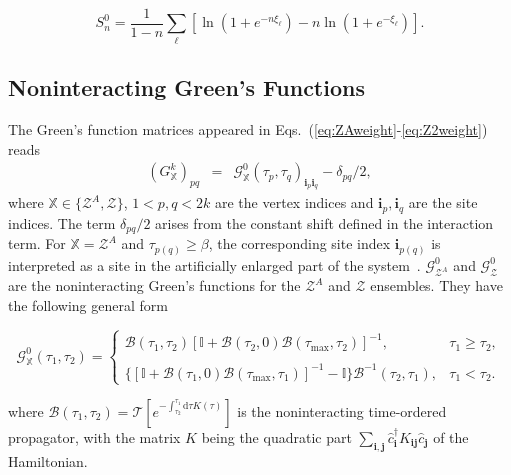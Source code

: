 \documentclass[twocolumn,english,prl,showpacs]{revtex4}
\begin{document}
\begin{equation*}
S_{n}^{0} = \frac{1}{1-n} \sum_{\ell} \left[ \ln (1+e^{-n\xi_{\ell}}) - n \ln(1+e^{-\xi_{\ell}}) \right]. 
\end{equation*}


\subsection{Noninteracting Green's Functions}
The Green's function matrices appeared in Eqs.~(\ref{eq:ZAweight}-\ref{eq:Z2weight}) reads
\begin{eqnarray}
\left(G^{k}_{\mathbb{X}} \right) _{pq} & =&\mathcal{G}^{0}_{\mathbb{X}}(\tau_{p}, \tau_{q}) _{\mathbf{i}_{p}\mathbf{i}_{q} } - \delta_{pq}/2,
\label{eq:G}
\end{eqnarray}
where $\mathbb{X}\in \{ \mathcal{Z}^{A}, \mathcal{Z}\}$,  $1<p,q<2k$ are the vertex indices and $\mathbf{i}_{p},\mathbf{i}_{q}$ are the site indices. The term $\delta_{pq}/2$ arises from the constant shift defined in the interaction term. For $\mathbb{X}=\mathcal{Z}^{A}$ and $\tau_{p(q)} \ge \beta$, the corresponding site index $\mathbf{i}_{p(q)}$ is interpreted  as a site in the artificially enlarged part of the system~\cite{Broecker:2014ud}. $\mathcal{G}^{0}_{\mathcal{Z}^{A}}$ and $\mathcal{G}^{0}_{\mathcal{Z}}$ are the noninteracting Green's functions for the $\mathcal{Z}^{A}$  and $\mathcal{Z}$ ensembles. They have the following general form
\cite{Assaad:2008hx}

\begin{widetext}
\begin{equation}
\mathcal{G}^{0}_{\mathbb{X}}(\tau_{1}, \tau_{2})   =\begin{cases}
 \mathcal{B}(\tau_{1}, \tau_{2}) [\mathbb{I} + \mathcal{B}(\tau_{2}, 0)\mathcal{B}(\tau_{\max}, \tau_{2}) ]^{-1} , & \text{$\tau_{1}\ge \tau_{2}$}, \\ \\
 \{ [\mathbb{I} +    \mathcal{B}(\tau_{1}, 0)\mathcal{B}(\tau_{\max}, \tau_{1})]^{-1} -\mathbb{I}\}   \mathcal{B}^{-1}(\tau_{2},\tau_{1})  
    , & \text{$\tau_{1}< \tau_{2}$}.
  \end{cases}
\label{eq:nonintgf}  
\end{equation}
\end{widetext}
where $\mathcal{B}(\tau_{1}, \tau_{2})= \mathcal{T} [e^{-\int_{\tau_{2}}^{\tau_{1}} \mathrm{d}\tau K(\tau)}]$ is the noninteracting time-ordered propagator, with the matrix $K$ being the quadratic part $\sum_\mathbf{i,j} \hat{c}^{\dagger}_{\mathbf{i}} K_\mathbf{ij} \hat{c}_{\mathbf{j}}$ of the Hamiltonian. 
 
\end{document}
